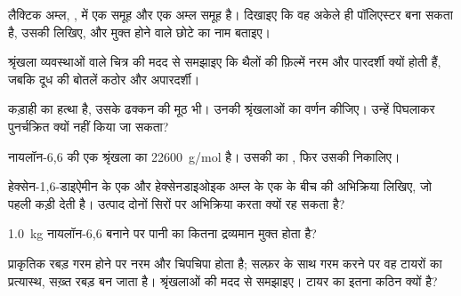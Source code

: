 \begin{exercise}[$\star\star$]\label{exo:g12:polymers:8}
लैक्टिक अम्ल, , में एक  समूह और एक अम्ल
समूह है। दिखाइए कि वह अकेले ही पॉलिएस्टर बना सकता है, उसकी  लिखिए, और मुक्त होने वाले छोटे  का नाम बताइए।
\end{exercise}

\begin{exercise}[$\star\star$]\label{exo:g12:polymers:9}
श्रृंखला व्यवस्थाओं वाले चित्र की मदद से समझाइए कि थैलों की फ़िल्में नरम
और पारदर्शी क्यों होती हैं, जबकि दूध की बोतलें कठोर और अपारदर्शी।
\end{exercise}

\begin{exercise}[$\star\star$]\label{exo:g12:polymers:10}
कड़ाही का हत्था  है, उसके  ढक्कन की मूठ भी। उनकी
श्रृंखलाओं का वर्णन कीजिए। उन्हें पिघलाकर पुनर्चक्रित क्यों नहीं किया जा सकता?
\end{exercise}

\begin{exercise}[$\star\star$]\label{exo:g12:polymers:11}
नायलॉन-6,6 की एक श्रृंखला का  \qty{22600}{g/mol} है। उसकी
  का , फिर उसकी  निकालिए।
\end{exercise}

\begin{exercise}[$\star\star\star$]\label{exo:g12:polymers:12}
हेक्सेन-1,6-डाइऐमीन के एक  और हेक्सेनडाइओइक अम्ल के एक  के बीच की
अभिक्रिया लिखिए, जो पहली  कड़ी देती है। उत्पाद दोनों सिरों पर
अभिक्रिया करता क्यों रह सकता है?
\end{exercise}

\begin{exercise}[$\star\star\star$]\label{exo:g12:polymers:13}
\qty{1.0}{kg} नायलॉन-6,6 बनाने पर पानी का कितना द्रव्यमान मुक्त होता है?
\end{exercise}

\begin{exercise}[$\star\star\star$]\label{exo:g12:polymers:14}
प्राकृतिक रबड़ गरम होने पर नरम और चिपचिपा होता है; सल्फ़र के साथ गरम करने पर वह
टायरों का प्रत्यास्थ, सख़्त रबड़ बन जाता है। श्रृंखलाओं की मदद से समझाइए।
टायर का  इतना कठिन क्यों है?
\end{exercise}

